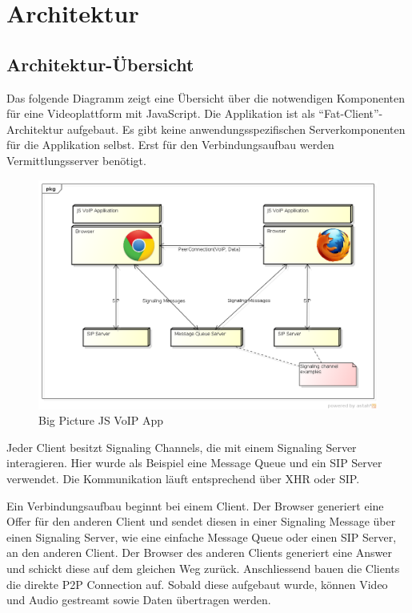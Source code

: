 \chapter{Architektur}

\section{Architektur-Übersicht}
	Das folgende Diagramm zeigt eine Übersicht über die notwendigen Komponenten für
	eine Videoplattform mit JavaScript. Die Applikation ist als
	"`Fat-Client"'-Architektur aufgebaut. Es gibt keine
	anwendungsspezifischen Serverkomponenten für die Applikation selbst. Erst für
	den Verbindungsaufbau werden Vermittlungsserver benötigt.
	\begin{figure}[H]
		\centering
		\includegraphics[width=1\textwidth]{../architekturanalayse/img/bigPicture.png}
		\caption{Big Picture JS VoIP App}
	\end{figure}
	
	Jeder Client besitzt Signaling Channels, die mit einem Signaling Server interagieren. Hier wurde als Beispiel eine Message Queue und ein SIP Server verwendet. Die Kommunikation läuft entsprechend über XHR oder SIP.
		
	Ein Verbindungsaufbau beginnt bei einem Client. Der Browser generiert eine
	Offer für den anderen Client und sendet diesen in einer Signaling Message über
	einen Signaling Server, wie eine einfache Message Queue oder einen SIP Server,
	an den anderen Client. Der Browser des anderen Clients generiert eine Answer
	und schickt diese auf dem gleichen Weg zurück. Anschliessend bauen die Clients
	die direkte P2P Connection auf. Sobald diese aufgebaut wurde, können Video und
	Audio gestreamt sowie Daten übertragen werden.
	
